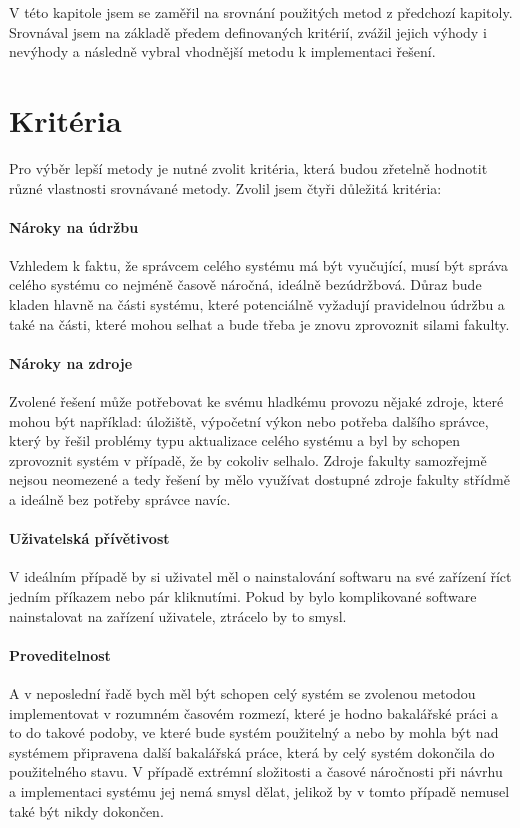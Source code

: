 \documentclass[
  digital,     %
  oneside,     %
  nosansbold,  %
  nocolorbold, %
  lof,         %
  lot,         %
]{fithesis4}
\begin{document}
V této kapitole jsem se zaměřil na srovnání použitých metod z předchozí
kapitoly. Srovnával jsem na základě předem definovaných kritérií, zvážil
jejich výhody i nevýhody a následně vybral vhodnější metodu k implementaci
řešení.


\section{Kritéria}

Pro výběr lepší metody je nutné zvolit kritéria, která budou zřetelně hodnotit
různé vlastnosti srovnávané metody. Zvolil jsem čtyři důležitá kritéria:

\paragraph{Nároky na údržbu}
Vzhledem k faktu, že správcem celého systému má být vyučující, musí být správa
celého systému co nejméně časově náročná, ideálně bezúdržbová. Důraz bude
kladen hlavně na části systému, které potenciálně vyžadují pravidelnou
údržbu a také na části, které mohou selhat a bude třeba je znovu zprovoznit
silami fakulty.

\paragraph{Nároky na zdroje}
Zvolené řešení může potřebovat ke svému hladkému provozu nějaké zdroje, které
mohou být například: úložiště, výpočetní výkon nebo potřeba dalšího správce,
který by řešil problémy typu aktualizace celého systému a byl by schopen zprovoznit
systém v případě, že by cokoliv selhalo. Zdroje fakulty samozřejmě nejsou neomezené
a tedy řešení by mělo využívat dostupné zdroje fakulty střídmě a ideálně bez potřeby
správce navíc.

\paragraph{Uživatelská přívětivost}
V ideálním případě by si uživatel měl o nainstalování softwaru na své zařízení
říct jedním příkazem nebo pár kliknutími. Pokud by bylo komplikované software
nainstalovat na zařízení uživatele, ztrácelo by to smysl.

\paragraph{Proveditelnost}
A v neposlední řadě bych měl být schopen celý systém se zvolenou metodou 
implementovat v rozumném časovém rozmezí, které je hodno bakalářské práci 
a to do takové podoby, ve které bude systém použitelný a nebo by mohla být
nad systémem připravena další bakalářská práce, která by celý systém dokončila
do použitelného stavu. V případě extrémní složitosti a časové náročnosti při 
návrhu a implementaci systému jej nemá smysl dělat, jelikož by v tomto případě
nemusel také být nikdy dokončen.
\end{document}
